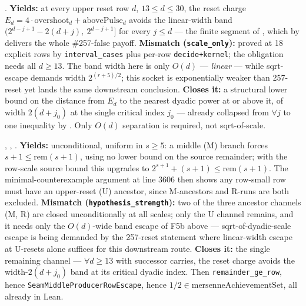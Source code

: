 \begin{obs} 
.
\textbf{Yields:} at every upper reset row $d$, $13 \le d \le 30$, the reset charge $E_d =
4\cdot\mathrm{overshoot}_d + \mathrm{abovePulse}_d$ avoids the linear-width band
$(2^{d-j+1}-2(d+j),\ 2^{d-j+1}]$ for every $j \le d$ — the finite segment of
, which by
delivers the whole \#257-false payoff.
\textbf{Mismatch (\texttt{scale\_only}):} proved at 18 explicit rows by \texttt{interval\_cases}
plus per-row \texttt{decide+kernel}; the obligation needs all $d \ge 13$. The band width here is
only $O(d)$ — \emph{linear} — while sqrt-escape demands width $2^{(r+5)/2}$; this socket is
exponentially weaker than 257-reset yet lands the same downstream conclusion.
\textbf{Closes it:} a structural lower bound on the distance from $E_d$ to the nearest dyadic
power at or above it, of width $2(d+j_0)$ at the single critical index $j_0$ — already collapsed
from $\forall j$ to one inequality by
.
Only $O(d)$ separation is required, not sqrt-of-scale.
\end{obs}

\begin{obs} 
,
,
.
\textbf{Yields:} unconditional, uniform in $s\ge5$: a middle (M) branch forces $s+1 \le
\mathrm{rem}(s+1)$, using no lower bound on the source remainder; with the row-scale source
bound this upgrades to $2^{s+1}+(s+1) \le \mathrm{rem}(s+1)$. The minimal-counterexample argument
at line 3606 then shows any row-small row must have an upper-reset (U) ancestor, since M-ancestors
and R-runs are both excluded.
\textbf{Mismatch (\texttt{hypothesis\_strength}):} two of the three ancestor channels (M, R) are
closed unconditionally at all scales; only the U channel remains, and it needs only the
$O(d)$-wide band escape of F5b above — sqrt-of-dyadic-scale escape is being demanded by the
257-reset statement where linear-width escape at U-resets alone suffices for this downstream
route.
\textbf{Closes it:} the single remaining channel — $\forall d \ge 13$ with successor carries, the
reset charge avoids the width-$2(d+j_0)$ band at its critical dyadic index. Then
\texttt{remainder\_ge\_row}, hence \texttt{SeamMiddleProducerRowEscape}, hence $1/2 \in
\mathrm{mersenneAchievementSet}$, all already in Lean.
\end{obs}

